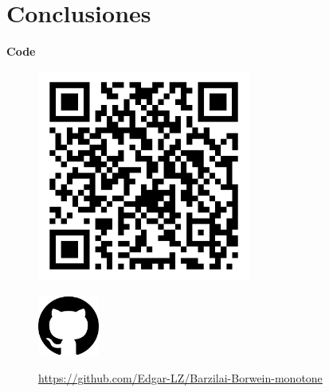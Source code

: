\section{Conclusiones}

\begin{frame}[fragile=singleslide]{\large \textbf{Code}}
    \begin{minipage}{7cm}
        \begin{figure}[ht!]
            \includegraphics[width=7cm]{Graphics/qr-code.png}
        \end{figure}
    \end{minipage}
    \begin{minipage}{7cm}
        \begin{figure}[ht!]
            \includegraphics[width=2cm]{Graphics/github.png}\\
            \caption*{\url{https://github.com/Edgar-LZ/Barzilai-Borwein-monotone}}
        \end{figure}
    \end{minipage}
\end{frame}